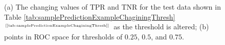 \documentclass[xcolor={table}]{beamer}
\newcommand{\ourRef}[1]{\ref{#1} $^{\text{\tiny[\pageref{#1}]}}$}
\begin{document}
 \begin{frame} 
\begin{figure}[!bth]
       \begin{centering}
       \caption{(a) The changing values of TPR and TNR for the test data shown in Table \ourRef{tab:samplePredictionExampleChaginingThresh} as the threshold is altered; (b) points in ROC space for thresholds of $0.25$, $0.5$, and $0.75$.}
       \end{centering}
       \label{fig:rocPanels1}
\end{figure}
\end{frame} 
\end{document}
